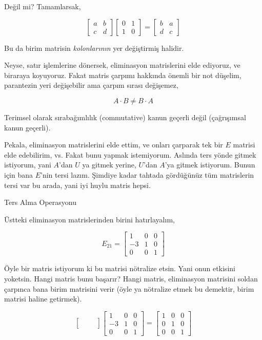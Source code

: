 \documentclass[12pt,fleqn]{article}\usepackage{../../common}
\begin{document}
Değil mi? Tamamlarsak,

$$ 
\left[\begin{array}{rr}
a & b \\
c & d
\end{array}\right]
\left[\begin{array}{rr}
0 & 1 \\
1 & 0
\end{array}\right]
=
\left[\begin{array}{rr}
b & a \\
d & c
\end{array}\right]
 $$

Bu da birim matrisin {\em kolonlarının} yer değiştirmiş halidir. 

Neyse, satır işlemlerine dönersek, eliminasyon matrislerini elde ediyoruz,
ve biraraya koyuyoruz. Fakat matris çarpımı hakkında önemli bir not
düşelim, parantezin yeri değişebilir ama çarpım sırası değişemez,

$$ A \cdot B \ne B \cdot A $$

Terimsel olarak sırabağımlılık (commutative) kanun geçerli değil
(çağrışımsal kanun geçerli).

Pekala, eliminasyon matrislerini elde ettim, ve onları çarparak tek bir $E$
matrisi elde edebilirim, vs. Fakat bunu yapmak istemiyorum. Aslında ters
yönde gitmek istiyorum, yani $A$'dan $U$ ya gitmek yerine, $U$'dan $A$'ya
gitmek istiyorum. Bunun için bana $E$'nin tersi lazım. Şimdiye kadar
tahtada gördüğünüz tüm matrislerin tersi var bu arada, yani iyi huylu
matris hepsi.

Ters Alma Operasyonu

Üstteki eliminasyon matrislerinden birini hatırlayalım, 

$$ E_{21} = \left[\begin{array}{rrr}
1 & 0 & 0 \\
-3 & 1 & 0 \\
0 & 0 & 1
\end{array}\right] $$

Öyle bir matris istiyorum ki bu matrisi nötralize etsin. Yani onun etkisini
yoketsin. Hangi matris bunu başarır? Hangi matris, eliminasyon matrisini
soldan çarpınca bana birim matrisini verir (öyle ya nötralize etmek bu
demektir, birim matrisi haline getirmek). 

$$ 
 \left[\begin{array}{rrr}
 &  &  \\
 &  &  \\
 &  & 
\end{array}\right] 
 \left[\begin{array}{rrr}
1 & 0 & 0 \\
-3 & 1 & 0 \\
0 & 0 & 1
\end{array}\right] 
=
 \left[\begin{array}{rrr}
1 & 0 & 0 \\
0 & 1 & 0 \\
0 & 0 & 1
\end{array}\right] 
$$
\end{document}
